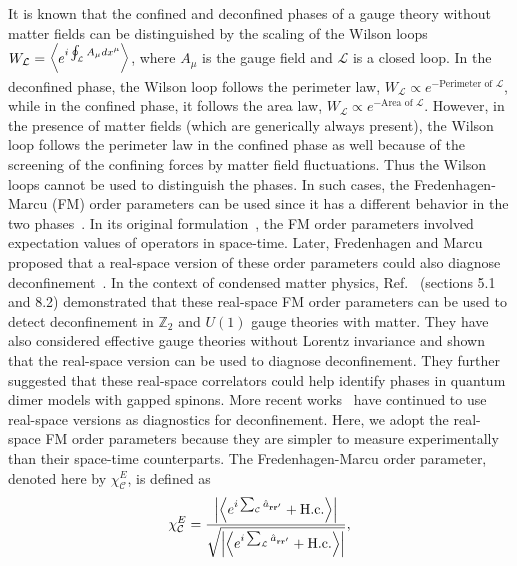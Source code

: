 \documentclass[twocolumn,superscriptaddress,amsmath,amssymb,aps,prx,nofootinbib]{revtex4-2}
\begin{document}
It is known that the confined and deconfined phases of a gauge theory without matter fields can be distinguished by the scaling of the Wilson loops $W_\mathcal{L} = \expval{ e^{i \oint_\mathcal{L} A_\mu dx^\mu} }$, where $A_\mu$ is the gauge field and $\mathcal{L}$ is a closed loop. In the deconfined phase, the Wilson loop follows the perimeter law, $W_{\mathcal{L}} \propto e^{-\text{Perimeter of }\mathcal{L}}$, while in the confined phase, it follows the area law, $W_{\mathcal{L}} \propto e^{-\text{Area of }\mathcal{L}}$. However, in the presence of matter fields (which are generically always present), the Wilson loop follows the perimeter law in the confined phase as well \cite{fradkin2013field,shankar2017quantum} because of the screening of the confining forces by matter field fluctuations. Thus the Wilson loops cannot be used to distinguish  the phases. In such cases, the Fredenhagen-Marcu (FM) order parameters can be used since it has a different behavior in the two phases~\cite{fredenhagen1983charged,fredenhagen1986,fredenhagen1988dual,marcu1986uses,bricmont1983order,gregor2011diagnosing,verresen2021,semeghini2021}. 
In its original formulation~\cite{fredenhagen1983charged}, the FM order parameters involved expectation values of operators in space-time.
Later, Fredenhagen and Marcu proposed that a real-space version of these order parameters could also diagnose deconfinement~\cite{fredenhagen1988dual}. In the context of condensed matter physics, Ref.~\cite{gregor2011diagnosing} (sections 5.1 and 8.2) demonstrated that these real-space FM order parameters can be used to detect deconfinement in $\mathbb{Z}_2$ and $U(1)$ gauge theories with matter.
They have also considered effective gauge theories without Lorentz invariance and shown that the real-space version can be used to diagnose deconfinement.
They further suggested that these real-space correlators could help identify phases in quantum dimer models with gapped spinons. More recent works~\cite{verresen2021,xu2024critical} have continued to use real-space versions as diagnostics for deconfinement. Here, we adopt the real-space FM order parameters because they are simpler to measure experimentally than their space-time counterparts.
The Fredenhagen-Marcu order parameter, denoted here by $\chi^E_{\mathcal{C}}$, is defined as
\begin{equation} \label{eq:FM_e}
  \chi_{\mathcal{C}}^E = \frac{\abs{ \expval{ e^{i\sum_\mathcal{C} \hat{a}_{\vb{r}\vb{r}'}  } +\text{H.c.} } } }{\sqrt{ \abs{ \expval{ e^{i \sum_{\mathcal{L}} \hat{a}_{\vb{r} \vb{r}'} } + \text{H.c.} }  }}},
\end{equation}
\end{document}
